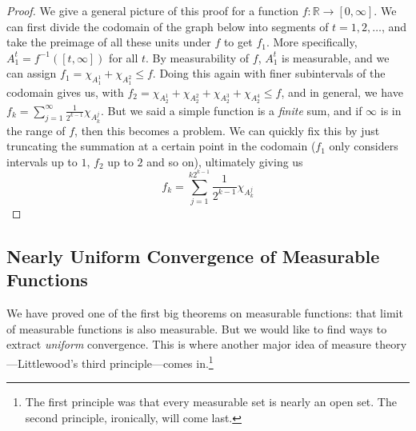   \begin{proof}
    We give a general picture of this proof for a function $f: \mathbb{R} \longrightarrow [0, \infty]$. We can first divide the codomain of the graph below into segments of $t = 1, 2, \ldots$, and take the preimage of all these units under $f$ to get $f_1$. More specifically, $A_1^t = f^{-1} ([t, \infty])$ for all $t$. By measurability of $f$, $A_1^t$ is measurable, and we can assign $f_1 = \chi_{A^1_1} + \chi_{A_1^2} \leq f$. 
    Doing this again with finer subintervals of the codomain gives us, with $f_2 = \chi_{A_2^1} + \chi_{A_2^2} + \chi_{A_2^3} + \chi_{A_2^4} \leq f$, and in general, we have $f_k = \sum_{j=1}^\infty \frac{1}{2^{k-1}} \chi_{A^j_k}$. But we said a simple function is a \textit{finite} sum, and if $\infty$ is in the range of $f$, then this becomes a problem. We can quickly fix this by just truncating the summation at a certain point in the codomain ($f_1$ only considers intervals up to $1$, $f_2$ up to $2$ and so on), ultimately giving us 
    \begin{equation}
      f_k = \sum_{j=1}^{k 2^{k-1}} \frac{1}{2^{k-1}} \chi_{A^j_k} 
    \end{equation}
  \end{proof}

\subsection{Nearly Uniform Convergence of Measurable Functions} 

  We have proved one of the first big theorems on measurable functions: that limit of measurable functions is also measurable. But we would like to find ways to extract \textit{uniform} convergence. This is where another major idea of measure theory---Littlewood's third principle---comes in.\footnote{The first principle was that every measurable set is nearly an open set. The second principle, ironically, will come last.} 


